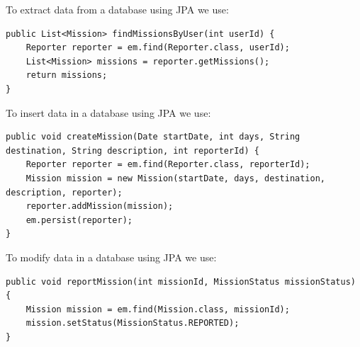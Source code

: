 \documentclass[12pt, a4paper]{report}
\begin{document}
    \begin{example}
        To extract data from a database using JPA we use: 
        \begin{lstlisting}[style=Java]
public List<Mission> findMissionsByUser(int userId) {
    Reporter reporter = em.find(Reporter.class, userId);
    List<Mission> missions = reporter.getMissions();
    return missions;
}
        \end{lstlisting}
        To insert data in a database using JPA we use: 
        \begin{lstlisting}[style=Java]
public void createMission(Date startDate, int days, String destination, String description, int reporterId) {
    Reporter reporter = em.find(Reporter.class, reporterId);
    Mission mission = new Mission(startDate, days, destination, description, reporter);
    reporter.addMission(mission);
    em.persist(reporter);
}        
        \end{lstlisting}
        To modify data in a database using JPA we use: 
        \begin{lstlisting}[style=Java]
public void reportMission(int missionId, MissionStatus missionStatus) {
    Mission mission = em.find(Mission.class, missionId);
    mission.setStatus(MissionStatus.REPORTED);
}
        \end{lstlisting}
    \end{example}
\end{document}
